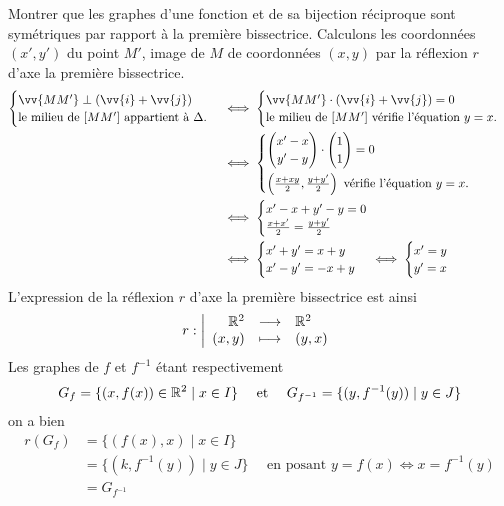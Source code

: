 \documentclass{article}
\begin{document}
\begin{question_kholle}{Montrer que les graphes d'une fonction et de sa bijection réciproque sont symétriques par rapport à la première bissectrice.}
	Calculons les coordonnées $(x',y')$ du point $M'$, image de $M$ de coordonnées $(x,y)$ par la réflexion $r$ d'axe la première bissectrice.
	\begin{align*}
		\begin{cases}
			\vv{MM'}\perp (\vv{i}+\vv{j}) \\
			\text{le milieu de $[MM']$ appartient à $\Delta$.}
		\end{cases}
		 & \iff
		\begin{cases}
			\vv{MM'}\cdot (\vv{i}+\vv{j})=0 \\
			\text{le milieu de $[MM']$ vérifie l'équation $y=x$.}
		\end{cases} \\
		 & \iff
		\begin{cases}
			\begin{pmatrix}x'-x\\y'-y\end{pmatrix}\cdot \begin{pmatrix}1\\1\end{pmatrix}=0 \\[12pt]
			\left(\frac{x+xy}{2},\frac{y+y'}{2}\right) \text{ vérifie l'équation $y=x$.}
		\end{cases}           \\
		 & \iff
		\begin{cases}
			x'-x+y'-y=0 \\
			\frac{x+x'}{2}=\frac{y+y'}{2}
		\end{cases}                                                          \\
		 & \iff
		\begin{cases}
			x'+y'=x+y \\
			x'-y'=-x+y
		\end{cases}
		\iff
		\begin{cases}
			x'=y \\
			y'=x
		\end{cases}
	\end{align*}
	L'expression de la réflexion $r$ d'axe la première bissectrice est ainsi
	\[
		r:\left|
		\begin{array}{rcl}
			\mathbb R^2  & \longrightarrow & \mathbb R^2  \\
			(x,y) & \longmapsto     & (y,x) \\
		\end{array}
		\right.
	\]
	Les graphes de $f$ et $f^{-1}$ étant respectivement
	\[
		G_f = \{(x,f(x))\in\mathbb R^2 \mid x\in I\} \quad\text{ et }\quad G_{f^{-1}}=\{(y,f^{-1}(y)) \mid y\in J\}
	\]
	on a bien
	\begin{align*}
		r(G_f) & =\{(f(x),x) \mid x\in I\}                                                      \\
		       & =\{(k,f^{-1}(y)) \mid y\in J\}\quad\text{ en posant $y=f(x) \iff x=f^{-1}(y)$} \\
		       & = G_{f^{-1}}
	\end{align*}
\end{question_kholle}
\end{document}
